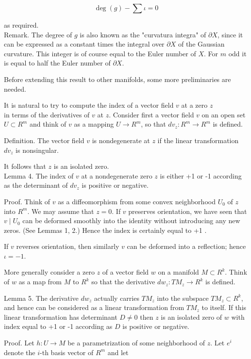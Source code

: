 \documentclass[10pt, letterpaper]{article}
\begin{document}
$$
\operatorname{deg}(g)-\sum \iota=0
$$

as required.\\
Remark. The degree of $g$ is also known as the "curvatura integra" of $\partial X$, since it can be expressed as a constant times the integral over $\partial X$ of the Gaussian curvature. This integer is of course equal to the Euler number of $X$. For $m$ odd it is equal to half the Euler number of $\partial X$.

Before extending this result to other manifolds, some more preliminaries are needed.

It is natural to try to compute the index of a vector field $v$ at a zero $z$\\
in terms of the derivatives of $v$ at $z$. Consider first a vector field $v$ on an open set $U \subset R^{m}$ and think of $v$ as a mapping $U \rightarrow R^{m}$, so that $d v_{z}: R^{m} \rightarrow R^{m}$ is defined.

Definition. The vector field $v$ is nondegenerate at $z$ if the linear transformation $d v_{z}$ is nonsingular.

It follows that $z$ is an isolated zero.\\
Lemma 4. The index of $v$ at a nondegenerate zero $z$ is either +1 or -1 according as the determinant of $d v_{z}$ is positive or negative.

Proof. Think of $v$ as a diffeomorphism from some convex neighborhood $U_{0}$ of $z$ into $R^{m}$. We may assume that $z=0$. If $v$ preserves orientation, we have seen that $v \mid U_{0}$ can be deformed smoothly into the identity without introducing any new zeros. (See Lemmas 1, 2.) Hence the index is certainly equal to +1 .

If $v$ reverses orientation, then similarly $v$ can be deformed into a reflection; hence $\iota=-1$.

More generally consider a zero $z$ of a vector field $w$ on a manifold $M \subset R^{k}$. Think of $w$ as a map from $M$ to $R^{k}$ so that the derivative $d w_{z}: T M_{z} \rightarrow R^{k}$ is defined.

Lemma 5. The derivative $d w_{z}$ actually carries $T M_{z}$ into the subspace $T M_{z} \subset R^{k}$, and hence can be considered as a linear transformation from $T M_{z}$ to itself. If this linear transformation has determinant $D \neq 0$ then $z$ is an isolated zero of $w$ with index equal to +1 or -1 according as $D$ is positive or negative.

Proof. Let $h: U \rightarrow M$ be a parametrization of some neighborhood of $z$. Let $e^{i}$ denote the $i$-th basis vector of $R^{m}$ and let
\end{document}
